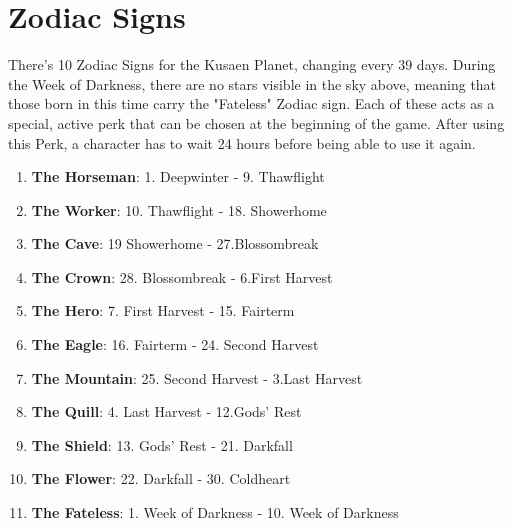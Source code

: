 \section{Zodiac Signs}
There's 10 Zodiac Signs for the Kusaen Planet, changing every 39 days. During the Week of Darkness, there are no stars visible in the sky above, meaning that those born in this time carry the "Fateless" Zodiac sign. Each of these acts as a special, active perk that can be chosen at the beginning of the game. After using this Perk, a character has to wait 24 hours before being able to use it again.\\

\begin{enumerate}
	\item \textbf{The Horseman}: 1. Deepwinter - 9. Thawflight
	\item \textbf{The Worker}: 10. Thawflight - 18. Showerhome
	\item \textbf{The Cave}: 19 Showerhome - 27.Blossombreak
	\item \textbf{The Crown}: 28. Blossombreak - 6.First Harvest
	\item \textbf{The Hero}: 7. First Harvest - 15. Fairterm
	\item \textbf{The Eagle}: 16. Fairterm - 24. Second Harvest
	\item \textbf{The Mountain}: 25. Second Harvest - 3.Last Harvest
	\item \textbf{The Quill}: 4. Last Harvest - 12.Gods' Rest
	\item \textbf{The Shield}: 13. Gods' Rest - 21. Darkfall
	\item \textbf{The Flower}: 22. Darkfall - 30. Coldheart
	\item \textbf{The Fateless}: 1. Week of Darkness - 10. Week of Darkness
\end{enumerate}












